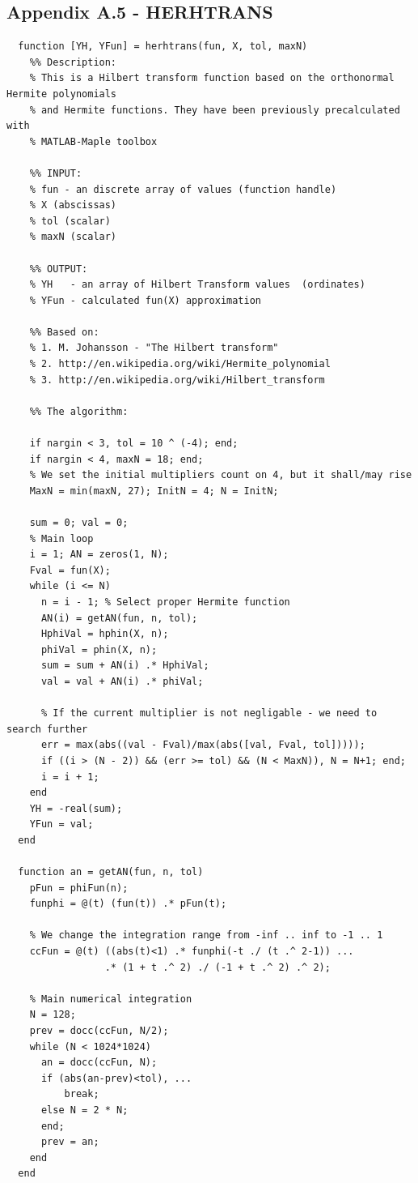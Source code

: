 \documentclass[12pt,twoside,a4paper]{article}
\numberwithin{equation}{subsection}
\numberwithin{figure}{subsection}
\begin{document}
\subsection*{Appendix A.5 - HERHTRANS}
\begin{lstlisting}
  function [YH, YFun] = herhtrans(fun, X, tol, maxN)
    %% Description: 
    % This is a Hilbert transform function based on the orthonormal Hermite polynomials 
    % and Hermite functions. They have been previously precalculated with 
    % MATLAB-Maple toolbox

    %% INPUT:
    % fun - an discrete array of values (function handle)
    % X (abscissas)
    % tol (scalar)
    % maxN (scalar)

    %% OUTPUT:
    % YH   - an array of Hilbert Transform values  (ordinates)
    % YFun - calculated fun(X) approximation

    %% Based on:
    % 1. M. Johansson - "The Hilbert transform"
    % 2. http://en.wikipedia.org/wiki/Hermite_polynomial
    % 3. http://en.wikipedia.org/wiki/Hilbert_transform

    %% The algorithm:

    if nargin < 3, tol = 10 ^ (-4); end;
    if nargin < 4, maxN = 18; end;
    % We set the initial multipliers count on 4, but it shall/may rise  
    MaxN = min(maxN, 27); InitN = 4; N = InitN;

    sum = 0; val = 0;
    % Main loop
    i = 1; AN = zeros(1, N);
    Fval = fun(X);
    while (i <= N)
      n = i - 1; % Select proper Hermite function
      AN(i) = getAN(fun, n, tol);
      HphiVal = hphin(X, n); 
      phiVal = phin(X, n); 
      sum = sum + AN(i) .* HphiVal;
      val = val + AN(i) .* phiVal;

      % If the current multiplier is not negligable - we need to search further
      err = max(abs((val - Fval)/max(abs([val, Fval, tol]))));
      if ((i > (N - 2)) && (err >= tol) && (N < MaxN)), N = N+1; end; 
      i = i + 1;
    end
    YH = -real(sum);
    YFun = val;
  end
	
  function an = getAN(fun, n, tol)
    pFun = phiFun(n);
    funphi = @(t) (fun(t)) .* pFun(t);

    % We change the integration range from -inf .. inf to -1 .. 1
    ccFun = @(t) ((abs(t)<1) .* funphi(-t ./ (t .^ 2-1)) ...
                 .* (1 + t .^ 2) ./ (-1 + t .^ 2) .^ 2);

    % Main numerical integration
    N = 128; 
    prev = docc(ccFun, N/2);
    while (N < 1024*1024)
      an = docc(ccFun, N);
      if (abs(an-prev)<tol), ...
          break; 
      else N = 2 * N; 
      end;
      prev = an;
    end
  end
			

\end{lstlisting}
\end{document}
